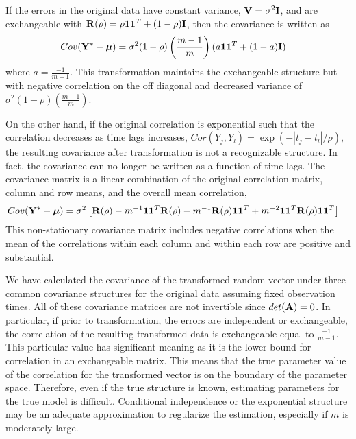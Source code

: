  If the errors in the original data have constant variance, $\mathbf V=\sigma^{2}\mathbf I$, and are exchangeable with $\mathbf R(\rho) = \rho\mathbf 1 \mathbf 1^{T} + (1-\rho)\mathbf I$, then the covariance is written as
 \begin{align*}
 Cov(\mathbf Y^{*}- \boldsymbol\mu) &=\sigma^{2}(1-\rho)\left(\frac{m-1}{m}\right)(a\mathbf 1\mathbf 1^{T}+ (1-a)\mathbf I)
 \end{align*} 
 where $a=\frac{-1}{m-1}$. This transformation maintains the exchangeable structure but with negative correlation on the off diagonal and decreased variance of $\sigma^{2}(1-\rho)\left(\frac{m-1}{m}\right)$.

 On the other hand, if the original correlation is exponential such that the correlation decreases as time lags increases, $Cor(Y_{j},Y_{l}) = \exp(-|t_{j}-t_{l}|/\rho)$, the resulting covariance after transformation is not a recognizable structure. In fact, the covariance can no longer be written as a function of time lags. The covariance matrix is a linear combination of the original correlation matrix, column and row means, and the overall mean correlation,
   \begin{align*}
 Cov(\mathbf Y^{*}- \boldsymbol\mu)  &= \sigma^{2}\left[\mathbf R(\rho)-m^{-1}\mathbf1\mathbf1^{T}\mathbf R(\rho)-m^{-1}\mathbf R(\rho)\mathbf1\mathbf1^{T} + m^{-2}\mathbf1\mathbf1^{T}\mathbf R(\rho)\mathbf1\mathbf1^{T}\right]
 \end{align*} 
 This non-stationary covariance matrix includes negative correlations when the mean of the correlations within each column and within each row are positive and substantial.
 
We have calculated the covariance of the transformed random vector under three common covariance structures for the original data assuming fixed observation times. All of these covariance matrices are not invertible since $det(\mathbf A) = 0$. In particular, if prior to transformation, the errors are independent or exchangeable, the correlation of the resulting transformed data is exchangeable equal to $\frac{-1}{m-1}$. This particular value has significant meaning as it is the lower bound for correlation in an exchangeable matrix. This means that the true parameter value of the correlation for the transformed vector is on the boundary of the parameter space. Therefore, even if the true structure is known, estimating parameters for the true model is difficult. Conditional independence or the exponential structure may be an adequate approximation to regularize the estimation, especially if $m$ is moderately large.\\

